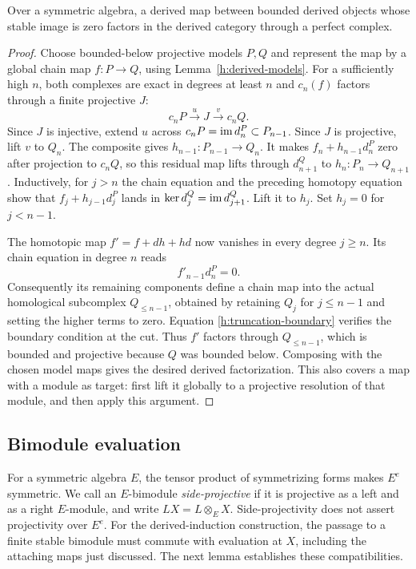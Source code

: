 \begin{lemma}
\label{h:perfect-factor}
Over a symmetric algebra, a derived map between bounded derived objects
whose stable image is zero factors in the derived category through a
perfect complex.
\end{lemma}

\begin{proof}
Choose bounded-below projective models $P,Q$ and represent the map by a
global chain map $f:P\to Q$, using Lemma~\ref{h:derived-models}. For a
sufficiently high $n$, both complexes are exact in degrees at least $n$
and $c_n(f)$ factors through a finite projective $J$:
\[
 c_nP\xrightarrow{u}J\xrightarrow{v}c_nQ.
\]
Since $J$ is injective, extend $u$ across
$c_nP=\operatorname{im} d_n^P\subset P_{n-1}$. Since $J$ is projective, lift $v$ to $Q_n$.
The composite gives $h_{n-1}:P_{n-1}\to Q_n$. It makes
$f_n+h_{n-1}d_n^P$ zero after projection to $c_nQ$, so this residual map
lifts through $d_{n+1}^Q$ to $h_n:P_n\to Q_{n+1}$. Inductively, for $j>n$
the chain equation and the preceding homotopy equation show that
$f_j+h_{j-1}d_j^P$ lands in $\ker d_j^Q=\operatorname{im} d_{j+1}^Q$. Lift it to $h_j$.
Set $h_j=0$ for $j<n-1$.

The homotopic map $f'=f+dh+hd$ now vanishes in every degree $j\geq n$.
Its chain equation in degree $n$ reads
\begin{equation}\label{h:truncation-boundary}
 f'_{n-1}d_n^P=0.
\end{equation}
Consequently its remaining components define a chain map into the actual
homological subcomplex $Q_{\leq n-1}$, obtained by retaining $Q_j$ for
$j\leq n-1$ and setting the higher terms to zero. Equation
\eqref{h:truncation-boundary} verifies the boundary condition at the cut.
Thus $f'$ factors through $Q_{\leq n-1}$, which is bounded and projective
because $Q$ was bounded below. Composing with the chosen model maps gives
the desired derived factorization. This also covers a map with a module
as target: first lift it globally to a projective resolution of that
module, and then apply this argument.
\end{proof}

\subsection{Bimodule evaluation}

For a symmetric algebra $E$, the tensor product of symmetrizing forms makes
$E^e$ symmetric. We call an $E$-bimodule \emph{side-projective} if it is
projective as a left and as a right $E$-module, and write $LX=L\otimes_EX$.
Side-projectivity does not assert projectivity over $E^e$.
For the derived-induction construction, the passage to a finite stable
bimodule must commute with evaluation at $X$, including the attaching
maps just discussed. The next lemma establishes these compatibilities.

